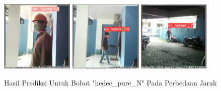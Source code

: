 \begin{enumerate}
  \begin{figure} [h!]
    \centering
    \includegraphics[width=0.31\textwidth]{gambar/BerdasarkanJarak_v2/val_hedec_pure_N/Jarak1_3/val_batch0_pred.jpg}
    \includegraphics[width=0.31\textwidth]{gambar/BerdasarkanJarak_v2/val_hedec_pure_N/Jarak5_3/val_batch0_pred.jpg}
    \includegraphics[width=0.31\textwidth]{gambar/BerdasarkanJarak_v2/val_hedec_pure_N/Jarak9/val_batch0_pred.jpg}
    \caption{Hasil Prediksi Untuk Bobot "hedec\_pure\_N" Pada Perbedaan Jarak}
    \label{fig:valjarak_sample_hedec_pure_N}  
  \end{figure}


\end{enumerate}
